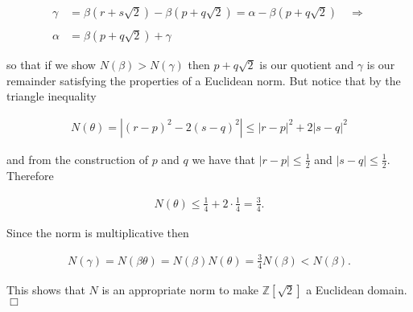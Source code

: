 \documentclass[11pt]{article}
\begin{document}
\begin{align*}
    \gamma &= \beta(r+s\sqrt 2)-\beta(p+q\sqrt 2) = \alpha - \beta(p+q\sqrt 2) \quad \Rightarrow \\\\
    \alpha &= \beta(p+q\sqrt 2) +\gamma 
\end{align*}

so that if we show $N(\beta)>N(\gamma)$ then $p+q\sqrt 2$ is our quotient and $\gamma$ is our remainder satisfying the properties of a Euclidean norm.  But notice that by the triangle inequality 

\begin{align*}
    N(\theta)=|(r-p)^2-2(s-q)^2| \leq |r-p|^2+2|s-q|^2
\end{align*}

and from the construction of $p$ and $q$ we have that $|r-p|\leq \frac 1 2$ and $|s-q|\leq \frac 1 2$.  Therefore 

\begin{align*}
    N(\theta) \leq \frac 1 4 + 2\cdot \frac 1 4 = \frac 3 4.
\end{align*}

Since the norm is multiplicative then 

\begin{align*}
    N(\gamma)=N(\beta\theta)=N(\beta)N(\theta)=\frac 3 4 N(\beta) < N(\beta).
\end{align*}

This shows that $N$ is an appropriate norm to make $\mathbb Z[\sqrt 2]$ a Euclidean domain.  $\Box$
\end{document}
